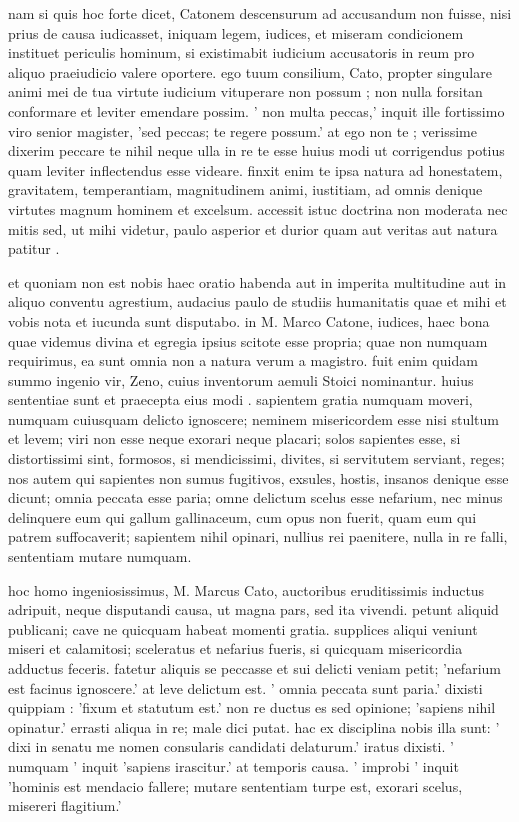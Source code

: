  nam si quis hoc forte dicet, Catonem descensurum ad accusandum non fuisse, nisi prius de causa iudicasset, iniquam legem, iudices, et miseram condicionem instituet periculis hominum, si existimabit iudicium accusatoris in reum pro aliquo praeiudicio valere oportere. ego tuum consilium, Cato, propter singulare animi mei de tua virtute iudicium vituperare non possum ; non nulla forsitan conformare et leviter emendare possim. ' non multa peccas,' inquit ille fortissimo viro senior magister, 'sed peccas; te regere possum.' at ego non te ; verissime dixerim peccare te nihil neque ulla in re te esse huius modi ut corrigendus potius quam leviter inflectendus esse videare. finxit enim te ipsa natura ad honestatem, gravitatem, temperantiam, magnitudinem animi, iustitiam, ad omnis denique virtutes magnum hominem et excelsum. accessit istuc doctrina non moderata nec mitis sed, ut mihi videtur, paulo asperior et durior quam aut veritas aut natura patitur .

 et quoniam non est nobis haec oratio habenda aut in imperita multitudine aut in aliquo conventu agrestium, audacius paulo de studiis humanitatis quae et mihi et vobis nota et iucunda sunt disputabo. in M. Marco Catone, iudices, haec bona quae videmus divina et egregia ipsius scitote esse propria; quae non numquam requirimus, ea sunt omnia non a natura verum a magistro. fuit enim quidam summo ingenio vir, Zeno, cuius inventorum aemuli Stoici nominantur. huius sententiae sunt et praecepta eius modi . sapientem gratia numquam moveri, numquam cuiusquam delicto ignoscere; neminem misericordem esse nisi stultum et levem; viri non esse neque exorari neque placari; solos sapientes esse, si distortissimi sint, formosos, si mendicissimi, divites, si servitutem serviant, reges; nos autem qui sapientes non sumus fugitivos, exsules, hostis, insanos denique esse dicunt; omnia peccata esse paria; omne delictum scelus esse nefarium, nec minus delinquere eum qui gallum gallinaceum, cum opus non fuerit, quam eum qui patrem suffocaverit; sapientem nihil opinari, nullius rei paenitere, nulla in re falli, sententiam mutare numquam.

 hoc homo ingeniosissimus, M. Marcus Cato, auctoribus eruditissimis inductus adripuit, neque disputandi causa, ut magna pars, sed ita vivendi. petunt aliquid publicani; cave ne quicquam habeat momenti gratia. supplices aliqui veniunt miseri et calamitosi; sceleratus et nefarius fueris, si quicquam misericordia adductus feceris. fatetur aliquis se peccasse et sui delicti veniam petit; 'nefarium est facinus ignoscere.' at leve delictum est. ' omnia peccata sunt paria.' dixisti quippiam : 'fixum et statutum est.' non re ductus es sed opinione; 'sapiens nihil opinatur.' errasti aliqua in re; male dici putat. hac ex disciplina nobis illa sunt: ' dixi in senatu me nomen consularis candidati delaturum.' iratus dixisti. ' numquam ' inquit 'sapiens irascitur.' at temporis causa. ' improbi ' inquit 'hominis est mendacio fallere; mutare sententiam turpe est, exorari scelus, misereri flagitium.'


